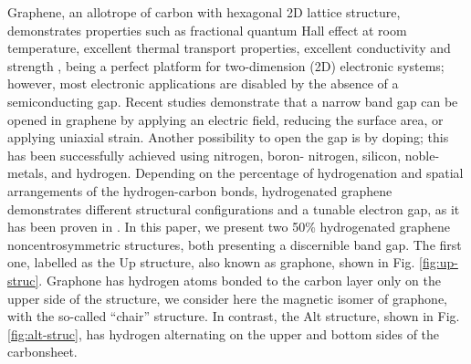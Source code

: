 \documentclass[floatfix,prb,aps,superscriptaddress,showpacs,11pt,preprint,letterpaper]{revtex4}
\begin{document}
Graphene, an allotrope of carbon with hexagonal 2D lattice structure,
demonstrates properties such as fractional quantum Hall effect at room
temperature, excellent thermal transport properties, excellent
conductivity\cite{heerscheNat07} and strength \cite{geimNM07, reinaNL08,
novoselov2S07, balandinNL08}, being a perfect platform  for two-dimension (2D)
electronic systems; however, most electronic applications are disabled by the
absence of a semiconducting gap. Recent studies demonstrate that a narrow band
gap  can be opened in graphene by applying an electric field,\cite{zhangN09}
reducing the surface area,\cite{hanPRL07} or applying uniaxial
strain.\cite{niACSN08} Another possibility to open the gap is by doping; this
has been successfully achieved using nitrogen,\cite{weiNL2009} boron-
nitrogen,\cite{guoIJ11} silicon,\cite{colettiPRB10} noble-
metals,\cite{varykhalovPRB10} and hydrogen.\cite{eliasS09, guisingerNL09,
samarakoonACSN10} Depending on the percentage of hydrogenation and spatial
arrangements of the hydrogen-carbon bonds, hydrogenated graphene demonstrates
different structural configurations and a tunable electron gap, as it has been
proven in \cite{shkrebtiiPSSC12}. In this paper, we present two 50\% hydrogenated graphene
noncentrosymmetric structures, both presenting a discernible band gap. The
first one, labelled as the Up structure, also known as
graphone,\cite{gmitraPRL13} shown in Fig. \ref{fig:up-struc}. Graphone has
hydrogen atoms bonded to the carbon layer only on the upper side of the
structure, we consider here the magnetic isomer of graphone, with the so-called
“chair” structure. In contrast,  the Alt structure, shown in Fig. 
\ref{fig:alt-struc}, has hydrogen alternating on the upper and bottom sides of 
the carbonsheet.\cite{zapataPSB2016}
\end{document}
